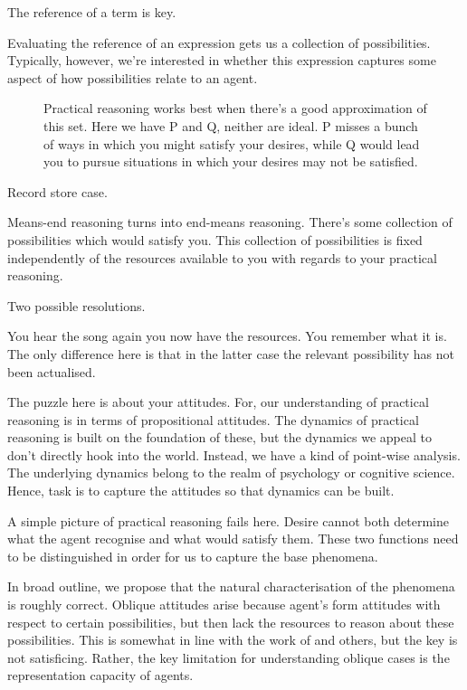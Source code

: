 \documentclass[10pt]{article}
\begin{document}
\newpage

The reference of a term is key.

Evaluating the reference of an expression gets us a collection of possibilities.
Typically, however, we're interested in whether this expression captures some aspect of how possibilities relate to an agent.








\begin{figure}[ht]
  \caption{Practical reasoning works best when there's a good approximation of this set.
    Here we have P and Q, neither are ideal.
    P misses a bunch of ways in which you might satisfy your desires, while Q would lead you to pursue situations in which your desires may not be satisfied.}
\end{figure}

\newpage



Record store case.

Means-end reasoning turns into end-means reasoning.
There's some collection of possibilities which would satisfy you.
This collection of possibilities is fixed independently of the resources available to you with regards to your practical reasoning.

Two possible resolutions.

You hear the song again you now have the resources.
You remember what it is.
The only difference here is that in the latter case the relevant possibility has not been actualised.

The puzzle here is about your attitudes.
For, our understanding of practical reasoning is in terms of propositional attitudes.
The dynamics of practical reasoning is built on the foundation of these, but the dynamics we appeal to don't directly hook into the world.
Instead, we have a kind of point-wise analysis.
The underlying dynamics belong to the realm of psychology or cognitive science.
Hence, task is to capture the attitudes so that dynamics can be built.

A simple picture of practical reasoning fails here.
Desire cannot both determine what the agent recognise and what would satisfy them.
These two functions need to be distinguished in order for us to capture the base phenomena.

In broad outline, we propose that the natural characterisation of the phenomena is roughly correct.
Oblique attitudes arise because agent's form attitudes with respect to certain possibilities, but then lack the resources to reason about these possibilities.
This is somewhat in line with the work of \citeauthor{Simon:1997aa} and others, but the key is not satisficing.
Rather, the key limitation for understanding oblique cases is the representation capacity of agents.
\end{document}
